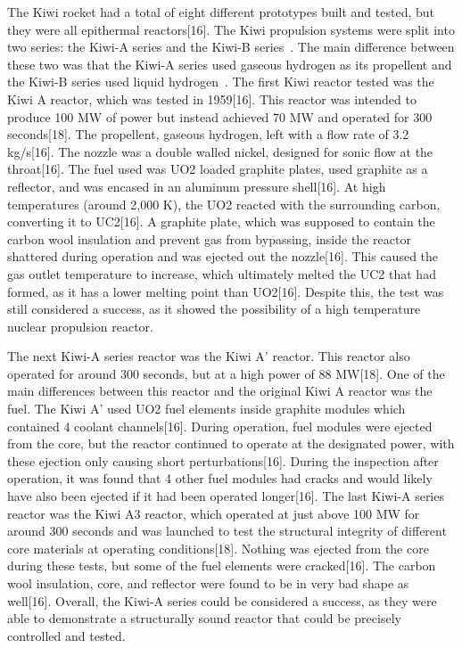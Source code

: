 \documentclass{article}
\begin{document}
    The Kiwi rocket had a total of eight different prototypes built and tested, but they were all epithermal reactors[16]. The Kiwi propulsion systems were split into two series: the Kiwi-A series and the Kiwi-B series~\cite{house1964development}. The main difference between these two was that the Kiwi-A series used gaseous hydrogen as its propellent and the Kiwi-B series used liquid hydrogen~\cite{house1964development}. The first Kiwi reactor tested was the Kiwi A reactor, which was tested in 1959[16]. This reactor was intended to produce 100 MW of power but instead achieved 70 MW and operated for 300 seconds[18]. The propellent, gaseous hydrogen, left with a flow rate of 3.2 kg/s[16]. The nozzle was a double walled nickel, designed for sonic flow at the throat[16]. The fuel used was UO2 loaded graphite plates, used graphite as a reflector, and was encased in an aluminum pressure shell[16]. At high temperatures (around 2,000 K), the UO2 reacted with the surrounding carbon, converting it to UC2[16]. A graphite plate, which was supposed to contain the carbon wool insulation and prevent gas from bypassing, inside the reactor shattered during operation and was ejected out the nozzle[16]. This caused the gas outlet temperature to increase, which ultimately melted the UC2 that had formed, as it has a lower melting point than UO2[16]. Despite this, the test was still considered a success, as it showed the possibility of a high temperature nuclear propulsion reactor. 


    The next Kiwi-A series reactor was the Kiwi A' reactor. This reactor also operated for around 300 seconds, but at a high power of 88 MW[18]. One of the main differences between this reactor and the original Kiwi A reactor was the fuel. The Kiwi A' used UO2 fuel elements inside graphite modules which contained 4 coolant channels[16]. During operation, fuel modules were ejected from the core, but the reactor continued to operate at the designated power, with these ejection only causing short perturbations[16]. During the inspection after operation, it was found that 4 other fuel modules had cracks and would likely have also been ejected if it had been operated longer[16]. 
    The last Kiwi-A series reactor was the Kiwi A3 reactor, which operated at just above 100 MW for around 300 seconds and was launched to test the structural integrity of different core materials at operating conditions[18]. Nothing was ejected from the core during these tests, but some of the fuel elements were cracked[16]. The carbon wool insulation, core, and reflector were found to be in very bad shape as well[16]. Overall, the Kiwi-A series could be considered a success, as they were able to demonstrate a structurally sound reactor that could be precisely controlled and tested. 
\end{document}
